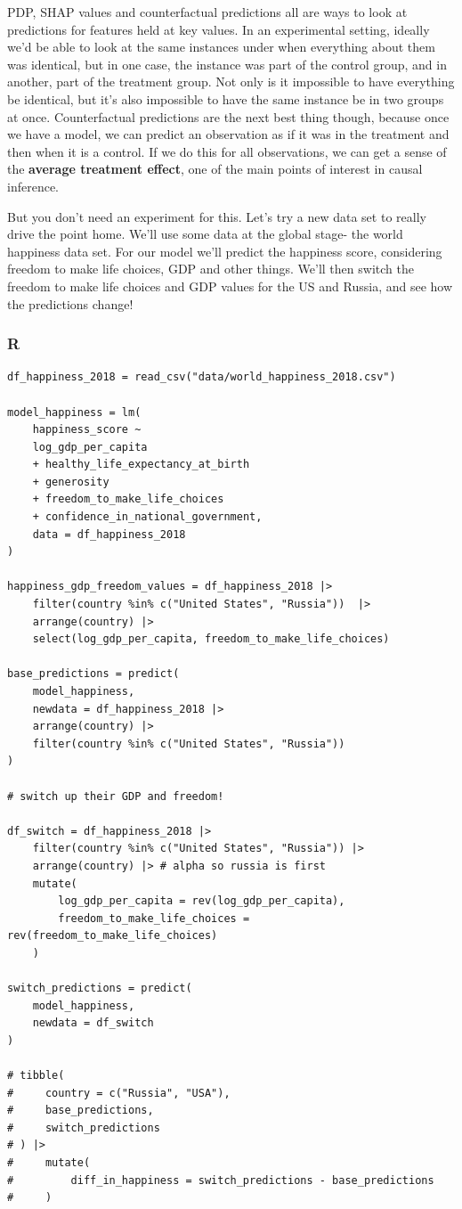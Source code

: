 \documentclass[
  letterpaper,
]{krantz}
\begin{document}
PDP, SHAP values and counterfactual predictions all are ways to look at
predictions for features held at key values. In an experimental setting,
ideally we'd be able to look at the same instances under when everything
about them was identical, but in one case, the instance was part of the
control group, and in another, part of the treatment group. Not only is
it impossible to have everything be identical, but it's also impossible
to have the same instance be in two groups at once. Counterfactual
predictions are the next best thing though, because once we have a
model, we can predict an observation as if it was in the treatment and
then when it is a control. If we do this for all observations, we can
get a sense of the \textbf{average treatment effect}, one of the main
points of interest in causal inference.

But you don't need an experiment for this. Let's try a new data set to
really drive the point home. We'll use some data at the global stage-
the world happiness data set. For our model we'll predict the happiness
score, considering freedom to make life choices, GDP and other things.
We'll then switch the freedom to make life choices and GDP values for
the US and Russia, and see how the predictions change!

\subsubsection{R}

\begin{verbatim}
df_happiness_2018 = read_csv("data/world_happiness_2018.csv")

model_happiness = lm(
    happiness_score ~ 
    log_gdp_per_capita 
    + healthy_life_expectancy_at_birth
    + generosity 
    + freedom_to_make_life_choices
    + confidence_in_national_government, 
    data = df_happiness_2018
)

happiness_gdp_freedom_values = df_happiness_2018 |> 
    filter(country %in% c("United States", "Russia"))  |> 
    arrange(country) |> 
    select(log_gdp_per_capita, freedom_to_make_life_choices)

base_predictions = predict(
    model_happiness, 
    newdata = df_happiness_2018 |> 
    arrange(country) |>
    filter(country %in% c("United States", "Russia")) 
)

# switch up their GDP and freedom!

df_switch = df_happiness_2018 |> 
    filter(country %in% c("United States", "Russia")) |> 
    arrange(country) |> # alpha so russia is first
    mutate(
        log_gdp_per_capita = rev(log_gdp_per_capita),
        freedom_to_make_life_choices = rev(freedom_to_make_life_choices)
    )

switch_predictions = predict(
    model_happiness, 
    newdata = df_switch
)

# tibble(
#     country = c("Russia", "USA"),
#     base_predictions,
#     switch_predictions
# ) |> 
#     mutate(
#         diff_in_happiness = switch_predictions - base_predictions
#     )
\end{verbatim}
\end{document}
